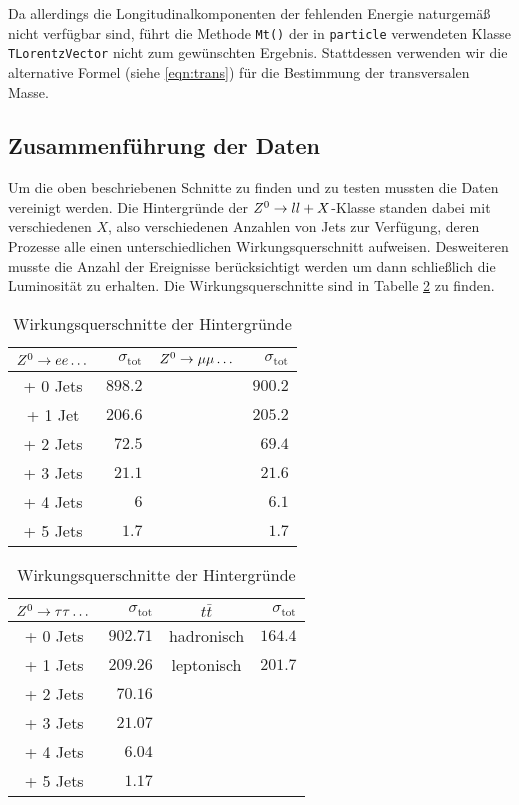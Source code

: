 Da allerdings die Longitudinalkomponenten der fehlenden Energie naturgemäß nicht
verfügbar sind, führt die Methode \lstinline'Mt()' der in \lstinline'particle'
verwendeten Klasse \lstinline'TLorentzVector' nicht zum gewünschten Ergebnis.
Stattdessen verwenden wir die alternative Formel (siehe \ref{eqn:trans}) für die
Bestimmung der transversalen Masse.

\subsection{Zusammenführung der Daten}
\label{cha:normierung}
Um die oben beschriebenen Schnitte zu finden und zu testen mussten die Daten
vereinigt werden. Die Hintergründe der $Z^0\to ll + X$-Klasse standen dabei mit
verschiedenen $X$, also verschiedenen Anzahlen von Jets zur Verfügung, deren
Prozesse alle einen unterschiedlichen Wirkungsquerschnitt aufweisen. Desweiteren
musste die Anzahl der Ereignisse berücksichtigt werden um dann schließlich die
Luminosität zu erhalten. Die Wirkungsquerschnitte sind in Tabelle \ref{tab:wqs}
zu finden.

\begin{table}
  \centering
  \begin{tabular}{cr|cr}
    \toprule
    $Z^0\to ee \dots$ & $\sigma_{\mathrm{tot}}$ & $Z^0\to\mu\mu \dots$ &
    $\sigma_{\mathrm{tot}}$ \\
    \midrule[0.75pt]
    + 0 Jets &  $898.2$ & & $900.2$ \\
    + 1 Jet &   $206.6$ & & $205.2$ \\
    + 2 Jets &  $72.5$  & & $69.4$ \\
    + 3 Jets &  $21.1$  & & $21.6$ \\
    + 4 Jets &  $6$  & & $6.1$ \\
    + 5 Jets &  $1.7$  & & $1.7$ \\
    \bottomrule
  \end{tabular}
  \begin{tabular}{cr|cr}
    \toprule
    $Z^0\to\tau\tau \dots$ & $\sigma_{\mathrm{tot}}$ & $t\bar{t}$ &
    $\sigma_{\mathrm{tot}}$ \\
    \midrule[0.75pt]
    + 0 Jets &  $902.71$  & hadronisch & $164.4$ \\
    + 1 Jets &  $209.26$  & leptonisch & $201.7$ \\
    + 2 Jets &  $70.16$  & & \\
    + 3 Jets &  $21.07$  & & \\
    + 4 Jets &  $6.04$  & & \\
    + 5 Jets &  $1.17$  & & \\
    \bottomrule
  \end{tabular}
  \caption{Wirkungsquerschnitte der Hintergründe}
  \label{tab:wqs}
\end{table}

